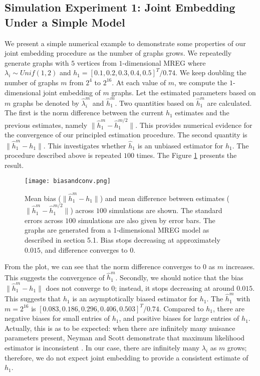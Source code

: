 \documentclass[10pt,journal,compsoc]{IEEEtran}
\begin{document}
\subsection{Simulation Experiment 1: Joint Embedding Under a Simple Model}
\noindent We present a simple numerical example to demonstrate some properties
of our joint embedding procedure as the number of graphs grows. We repeatedly generate graphs with $5$ vertices from $1$-dimensional MREG where $\lambda_i \sim Unif(1,2)$ and $h_1=[0.1,0.2,0.3,0.4,0.5]^T/0.74$. We keep doubling the number of graphs $m$ from $2^4$ to $2^{16}$. At each value of $m$, we compute the $1$-dimensional joint embedding of $m$ graphs. Let the estimated parameters based on $m$ graphs be denoted by $\hat{\lambda}_i^m$ and $\hat{h}_1^m$. Two quantities based on $\hat{h}_1^m$ are calculated. The first is the norm difference between the current $h_1$ estimates and the previous estimates, namely $\|\hat{h}_1^m-\hat{h}_1^{m/2}\|$. This provides numerical evidence for the convergence of our principled estimation procedure. The second quantity is $\|\hat{h}^m_1-h_1\|$. This investigates whether $\hat{h}_1$ is an unbiased estimator for $h_1$. The procedure described above is repeated $100$ times. The Figure \ref{fig:db} presents the result. \\

\begin{figure}[!htbp]
	\centering
	\texttt{[image: biasandconv.png]}
	\caption{Mean bias ($\|\hat{h}^m_1-h_1\|$) and mean difference between estimates ($\|\hat{h}_1^m-\hat{h}_1^{m/2}\|$) across $100$ simulations are shown. The standard errors across $100$ simulations are also given by error bars. The graphs are generated from a $1$-dimensional MREG model as described in section 5.1. Bias stops decreasing at approximately $0.015$, and difference converges to $0$.}
	\label{fig:db}
\end{figure}

\noindent From the plot, we can see that the norm difference converges to $0$ as $m$ increases. This suggests the convergence of $\hat{h}_1^m$. Secondly, we should notice that the bias $\|\hat{h}^m_1-h_1\|$ does not converge to $0$; instead, it stops decreasing at around $0.015$. This suggests that $\hat{h}_1$ is an asymptotically biased estimator for $h_1$. The $\hat{h}_1^m$ with $m=2^{16}$ is $[0.083,0.186, 0.296, 0.406, 0.503]^T/0.74$. Compared to $h_1$, there are negative biases for small entries of $h_1$, and positive biases for large entries of $h_1$. Actually, this is as to be expected: when there are infinitely many nuisance parameters present, Neyman and Scott demonstrate that maximum likelihood estimator is inconsistent \cite{neyman1948consistent}. In our case, there are infinitely many $\lambda_i$ as $m$ grows; therefore, we do not expect joint embedding to provide a consistent estimate of $h_1$. \\
\end{document}
